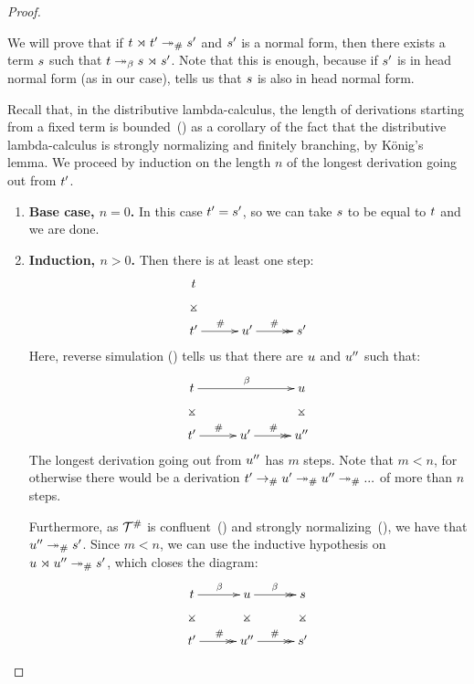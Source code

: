 \begin{proof}
\begin{itemize}
    We will prove that if $t \mathrel{\rtimes} t' \mathrel{\twoheadrightarrow}_{\mathtt{\#}} s'$ and $s'$ is a normal form,
    then there exists a term $s$ such that $t \mathrel{\twoheadrightarrow_\beta} s \mathrel{\rtimes} s'$.
    Note that this is enough, because if $s'$ is in head normal form (as in our case),
     tells us that $s$ is also in head normal form.

    Recall that, in the distributive lambda-calculus,
    the length of derivations starting from a fixed term
    is bounded~()
    as a corollary of the fact that the distributive lambda-calculus
    is strongly normalizing and finitely branching, by K\"onig's lemma.
    We proceed by induction on the length $n$ of the longest derivation going out from $t'$.
    \begin{enumerate}
      \item {\bf Base case, $n = 0$.} In this case $t' = s'$,
        so we can take $s$ to be equal to $t$ and we are done.
      \item {\bf Induction, $n > 0$.}
        Then there is at least one step:
        \[
        \xymatrix@C=1cm{
          \tm  \ar@{}[d]|*=0[@]{\rtimes}  & &      \\
          \tm' \ar@{->}[r]^{\dist} & \tmthree' \ar@{->>}[r]^{\dist} & \tmtwo' \\
        }
        \]
        Here, reverse simulation () tells us that there are $u$ and $u''$
        such that:
        \[
        \xymatrix@C=1cm{
          \tm  \ar@{}[d]|*=0[@]{\rtimes} \ar@{->}[rr]^{\beta} & & \tmthree  \ar@{}[d]|*=0[@]{\rtimes} \\
          \tm' \ar@{->}[r]^{\dist} & \tmthree' \ar@{->>}[r]^{\dist} & \tmthree'' \\
        }
        \]
        The longest derivation going out from $u''$ has $m$ steps.
        Note that $m < n$, for otherwise there would be a derivation $t' \mathrel{\to_{\mathtt{\#}}} u' \mathrel{\twoheadrightarrow_{\mathtt{\#}}} u'' \mathrel{\twoheadrightarrow_{\mathtt{\#}}} ...$ 
        of more than $n$ steps.

        Furthermore, as $\mathcal{T}^{\mathtt{\#}}$ is confluent~() and strongly normalizing~(),
        we have that $u'' \mathrel{\twoheadrightarrow}_{\mathtt{\#}} s'$.
        Since $m < n$, we can use the inductive hypothesis
        on $u \mathrel{\rtimes} u'' \mathrel{\twoheadrightarrow}_{\mathtt{\#}} s'$, which closes the diagram:
        \[
        \xymatrix@C=1cm{
          \tm  \ar@{}[d]|*=0[@]{\rtimes} \ar@{->}[r]^{\beta} & \tmthree \ar@{}[d]|*=0[@]{\rtimes} \ar@{->>}[r]^{\beta} & \tmtwo \ar@{}[d]|*=0[@]{\rtimes} \\
          \tm' \ar@{->>}[r]^{\dist} & \tmthree'' \ar@{->>}[r]^{\dist} & \tmtwo' \\
        }
        \]
    \end{enumerate}
\end{itemize}
\end{proof}
